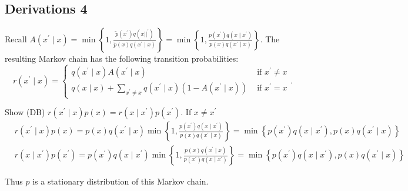 \subsection{Derivations 4}
\label{sec:proof-metro}
Recall $A\left(x^{\prime} \mid x\right)=\min \left\{1, \frac{\tilde{p}\left(x^{\prime}\right) q\left(x||^{\prime}\right)}{\tilde{p}(x) q\left(x^{\prime} \mid x\right)}\right\}=\min \left\{1, \frac{p\left(x^{\prime}\right) q\left(x \mid x^{\prime}\right)}{p(x) q\left(x^{\prime} \mid x\right)}\right\}$.
The resulting Markov chain has the following transition probabilities:
$$
r\left(x^{\prime} \mid x\right)=\left\{\begin{array}{ll}
q\left(x^{\prime} \mid x\right) A\left(x^{\prime} \mid x\right) & \text { if } x^{\prime} \neq x \\
q(x \mid x)+\sum_{x^{\prime} \neq x} q\left(x^{\prime} \mid x\right)\left(1-A\left(x^{\prime} \mid x\right)\right) & \text { if } x^{\prime}=x
\end{array} .\right.
$$

Show (DB) $r\left(x^{\prime} \mid x\right) p(x)=r\left(x \mid x^{\prime}\right) p\left(x^{\prime}\right)$. If $x \neq x^{\prime}$
$$
\begin{aligned}
& r\left(x^{\prime} \mid x\right) p(x)=p(x) q\left(x^{\prime} \mid x\right) \min \left\{1, \frac{p\left(x^{\prime}\right) q\left(x \mid x^{\prime}\right)}{p(x) q\left(x^{\prime} \mid x\right)}\right\}=\min \left\{p\left(x^{\prime}\right) q\left(x \mid x^{\prime}\right), p(x) q\left(x^{\prime} \mid x\right)\right\} \\
& r\left(x \mid x^{\prime}\right) p\left(x^{\prime}\right)=p\left(x^{\prime}\right) q\left(x \mid x^{\prime}\right) \min \left\{1, \frac{p(x) q\left(x^{\prime} \mid x\right)}{p\left(x^{\prime}\right) q\left(x \mid x^{\prime}\right)}\right\}=\min \left\{p\left(x^{\prime}\right) q\left(x \mid x^{\prime}\right), p(x) q\left(x^{\prime} \mid x\right)\right\}
\end{aligned}
$$

Thus $p$ is a stationary distribution of this Markov chain.